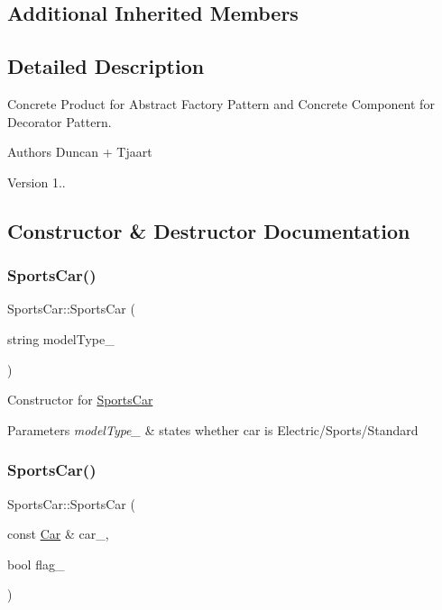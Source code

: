 \subsection*{Additional Inherited Members}


\subsection{Detailed Description}
Concrete Product for Abstract Factory Pattern and Concrete Component for Decorator Pattern. 

\begin{DoxyAuthor}{Authors}
Duncan + Tjaart 
\end{DoxyAuthor}
\begin{DoxyVersion}{Version}
1.. 
\end{DoxyVersion}


\subsection{Constructor \& Destructor Documentation}
\mbox{\label{class_sports_car_a12c07f42ba9979fda7e3de7fc195ed0a}} 
\subsubsection{\texorpdfstring{Sports\+Car()}{SportsCar()}\hspace{0.1cm}{\footnotesize\ttfamily [1/2]}}
{\footnotesize\ttfamily Sports\+Car\+::\+Sports\+Car (\begin{DoxyParamCaption}\item[{string}]{model\+Type\+\_\+ }\end{DoxyParamCaption})}

Constructor for \mbox{\hyperlink{class_sports_car}{Sports\+Car}} 
\begin{DoxyParams}{Parameters}
{\em model\+Type\+\_\+} & states whether car is Electric/\+Sports/\+Standard \\
\hline
\end{DoxyParams}
\mbox{\label{class_sports_car_a92c5c238debbe61e1db2b2e42a81e814}} 
\subsubsection{\texorpdfstring{Sports\+Car()}{SportsCar()}\hspace{0.1cm}{\footnotesize\ttfamily [2/2]}}
{\footnotesize\ttfamily Sports\+Car\+::\+Sports\+Car (\begin{DoxyParamCaption}\item[{const \mbox{\hyperlink{class_car}{Car}} \&}]{car\+\_\+,  }\item[{bool}]{flag\+\_\+ }\end{DoxyParamCaption})}

